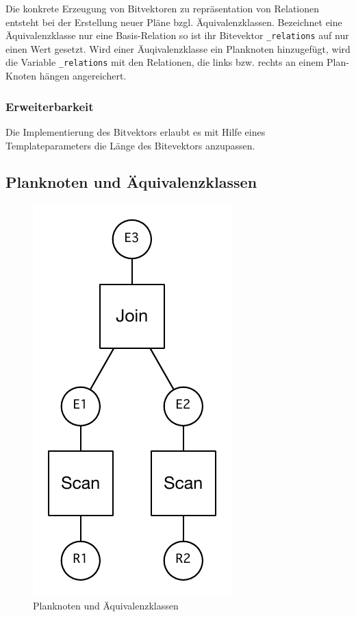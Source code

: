 Die konkrete Erzeugung von Bitvektoren zu repräsentation von Relationen entsteht bei der Erstellung neuer Pläne bzgl. Äquivalenzklassen. Bezeichnet eine Äquivalenzklasse nur eine Basis-Relation so ist ihr Bitevektor \texttt{\_relations} auf nur einen Wert gesetzt. Wird einer Äuqivalenzklasse ein Planknoten hinzugefügt, wird die Variable \texttt{\_relations} mit den Relationen, die links bzw. rechts an einem Plan-Knoten hängen angereichert.



\subsubsection{Erweiterbarkeit}
Die Implementierung des Bitvektors erlaubt es mit Hilfe eines Templateparameters die Länge des Bitevektors anzupassen.



\subsection{Planknoten und Äquivalenzklassen}




\begin{figure}[ht]
  \centering
  \includegraphics{04_Implementierung/JoinScan.pdf}
  \caption{Planknoten und Äquivalenzklassen}
  \label{PlanAequi}
\end{figure}


